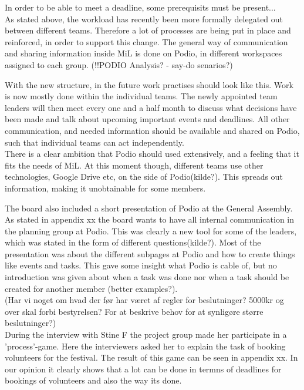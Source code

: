 In order to be able to meet a deadline, some prerequisits must be present...\\


As stated above, the workload has recently been more formally delegated out between different teams. Therefore a lot of processes are being put in place and reinforced, in order to support this change. The general way of communication and sharing information inside MiL is done on Podio, in different workspaces assigned to each group. (!!PODIO Analysis? - say-do senarios?) \

With the new structure, in the future work practises should look like this. Work is now mostly done within the individual teams. The newly appointed team leaders will then meet every one and a half month to discuss what decisions have been made and talk about upcoming important events and deadlines. All other communication, and needed information should be available and shared on Podio, such that individual teams can act independently.\\

There is a clear ambition that Podio should used extensively, and a feeling that it fits the needs of MiL. At this moment though, different teams use other technologies, Google Drive etc, on the side of Podio(kilde?). This spreads out information, making it unobtainable for some members. \

The board also included a short presentation of Podio at the General Assembly. As stated in appendix xx the board wants to have all internal communication in the planning group at Podio. This was clearly a new tool for some of the leaders, which was stated in the form of different questions(kilde?). Most of the presentation was about the different subpages at Podio and how to create things like events and tasks. This gave some insight what Podio is cable of, but no introduction was given about when a task was done nor when a task should be created for another member (better examples?).\\

(Har vi noget om hvad der før har været af regler for beslutninger? 5000kr og over skal forbi bestyrelsen? For at beskrive behov for at synligøre større beslutninger?)\\

During the interview with Stine F the project group made her participate in a 'process'-game. Here the interviewers asked her to explain the task of booking volunteers for the festival. The result of this game can be seen in appendix xx. In our opinion it clearly shows that a lot can be done in termns of deadlines for bookings of volunteers and also the way its done.

